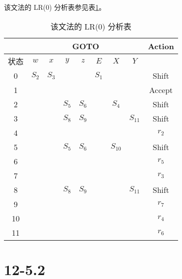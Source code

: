 \documentclass[UTF8]{ctexart}
\begin{document}
        该文法的 LR(0) 分析表参见表\ref{lr0anal}。
        \begin{table}[htbp!]
            \centering
            \begin{tabular}{|c|c|c|c|c|c|c|c|c|}
                \hline
                & \multicolumn{7}{|c|}{GOTO} & Action\\
                \hline
                状态 & $w$ & $x$ & $y$ & $z$ & $E$ & $X$ & $Y$ &      \\
                \hline
                0    &$S_2$&$S_3$&     &     &$S_1$&     &     & Shift \\
                \hline
                1    &     &     &     &     &     &     &     & Accept \\
                \hline
                2    &     &     &$S_5$&$S_6$&     &$S_4$&     & Shift \\
                \hline
                3    &     &     &$S_8$&$S_9$&     &     &$S_{11}$& Shift \\
                \hline
                4    &     &     &     &     &     &     &     & $r_2$ \\
                \hline
                5    &     &     &$S_5$&$S_6$&     &$S_{10}$&     & Shift \\
                \hline
                6    &     &     &     &     &     &     &     & $r_5$ \\
                \hline
                7    &     &     &     &     &     &     &     & $r_3$ \\
                \hline
                8    &     &     &$S_8$&$S_9$&     &     &$S_{11}$& Shift \\
                \hline
                9    &     &     &     &     &     &     &     & $r_7$ \\
                \hline
                10   &     &     &     &     &     &     &     & $r_4$ \\
                \hline
                11   &     &     &     &     &     &     &     & $r_6$ \\
                \hline
            \end{tabular}
            \caption{该文法的 LR(0) 分析表}
            \label{lr0anal}
        \end{table}

\section*{12-5.2}
\end{document}
